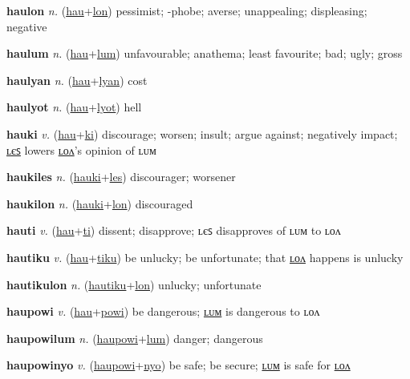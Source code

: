 \textbf{\hypertarget{haulon}{haulon}} \textit{n.} (\hyperlink{hau}{hau}+\allowbreak \hyperlink{lon}{lon})
pessimist; -phobe; averse; unappealing; displeasing; negative

\textbf{\hypertarget{haulum}{haulum}} \textit{n.} (\hyperlink{hau}{hau}+\allowbreak \hyperlink{lum}{lum})
unfavourable; anathema; least favourite; bad; ugly; gross

\textbf{\hypertarget{haulyan}{haulyan}} \textit{n.} (\hyperlink{hau}{hau}+\allowbreak \hyperlink{lyan}{lyan})
cost

\textbf{\hypertarget{haulyot}{haulyot}} \textit{n.} (\hyperlink{hau}{hau}+\allowbreak \hyperlink{lyot}{lyot})
hell

\textbf{\hypertarget{hauki}{hauki}} \textit{v.} (\hyperlink{hau}{hau}+\allowbreak \hyperlink{ki}{ki})
discourage; worsen; insult; argue against; negatively impact; \hyperlink{haukiles}{ʟєꜱ} lowers \hyperlink{haukilon}{ʟᴏᴧ}’s opinion of ʟᴜᴍ

\textbf{\hypertarget{haukiles}{haukiles}} \textit{n.} (\hyperlink{hauki}{hauki}+\allowbreak \hyperlink{les}{les})
discourager; worsener

\textbf{\hypertarget{haukilon}{haukilon}} \textit{n.} (\hyperlink{hauki}{hauki}+\allowbreak \hyperlink{lon}{lon})
discouraged

\textbf{\hypertarget{hauti}{hauti}} \textit{v.} (\hyperlink{hau}{hau}+\allowbreak \hyperlink{ti}{ti})
dissent; disapprove; ʟєꜱ disapproves of ʟᴜᴍ to ʟᴏᴧ

\textbf{\hypertarget{hautiku}{hautiku}} \textit{v.} (\hyperlink{hau}{hau}+\allowbreak \hyperlink{tiku}{tiku})
be unlucky; be unfortunate; that \hyperlink{hautikulon}{ʟᴏᴧ} happens is unlucky

\textbf{\hypertarget{hautikulon}{hautikulon}} \textit{n.} (\hyperlink{hautiku}{hautiku}+\allowbreak \hyperlink{lon}{lon})
unlucky; unfortunate

\textbf{\hypertarget{haupowi}{haupowi}} \textit{v.} (\hyperlink{hau}{hau}+\allowbreak \hyperlink{powi}{powi})
be dangerous; \hyperlink{haupowilum}{ʟᴜᴍ} is dangerous to ʟᴏᴧ

\textbf{\hypertarget{haupowilum}{haupowilum}} \textit{n.} (\hyperlink{haupowi}{haupowi}+\allowbreak \hyperlink{lum}{lum})
danger; dangerous

\textbf{\hypertarget{haupowinyo}{haupowinyo}} \textit{v.} (\hyperlink{haupowi}{haupowi}+\allowbreak \hyperlink{nyo}{nyo})
be safe; be secure; \hyperlink{haupowinyolum}{ʟᴜᴍ} is safe for \hyperlink{haupowinyolon}{ʟᴏᴧ}


